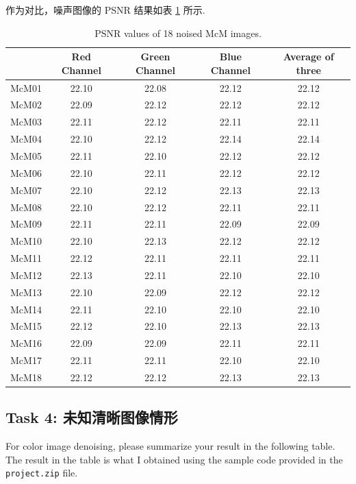 \documentclass[a4paper,11pt]{article}
\begin{document}
作为对比，噪声图像的 PSNR 结果如表 \ref{tab:noisy_task3} 所示. 

\begin{table}[H]
	\centering
	\caption{PSNR values of 18 noised McM images.}
	\label{tab:noisy_task3}
	\begin{tabular}{|c|c|c|c|c|}
	\hline
		 & Red Channel & Green Channel & Blue Channel & Average of three \\ \hline
		McM01 & 22.10 & 22.08 & 22.12 & 22.12 \\ \hline
		McM02 & 22.09 & 22.12 & 22.12 & 22.12 \\ \hline
		McM03 & 22.11 & 22.12 & 22.11 & 22.11 \\ \hline
		McM04 & 22.10 & 22.12 & 22.14 & 22.14 \\ \hline
		McM05 & 22.11 & 22.10 & 22.12 & 22.12 \\ \hline
		McM06 & 22.10 & 22.11 & 22.12 & 22.12 \\ \hline
		McM07 & 22.10 & 22.12 & 22.13 & 22.13 \\ \hline
		McM08 & 22.10 & 22.12 & 22.11 & 22.11 \\ \hline
		McM09 & 22.11 & 22.11 & 22.09 & 22.09 \\ \hline
		McM10 & 22.10 & 22.13 & 22.12 & 22.12 \\ \hline
		McM11 & 22.12 & 22.11 & 22.11 & 22.11 \\ \hline
		McM12 & 22.13 & 22.11 & 22.10 & 22.10 \\ \hline
		McM13 & 22.10 & 22.09 & 22.12 & 22.12 \\ \hline
		McM14 & 22.11 & 22.10 & 22.10 & 22.10 \\ \hline
		McM15 & 22.12 & 22.10 & 22.13 & 22.13 \\ \hline
		McM16 & 22.09 & 22.09 & 22.11 & 22.11 \\ \hline
		McM17 & 22.11 & 22.11 & 22.10 & 22.10 \\ \hline
		McM18 & 22.12 & 22.12 & 22.13 & 22.13 \\ \hline
	\end{tabular}
\end{table}


\clearpage


\subsection{Task 4: 未知清晰图像情形}

For color image denoising, please summarize your result in the following table. The result in the table is what I obtained using the sample code provided in the {\tt project.zip} file. 
\end{document}
